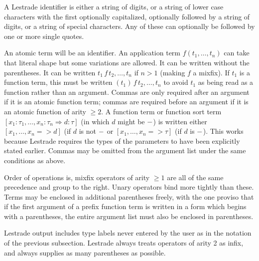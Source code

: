 \documentclass[12pt]{article}
\begin{document}
A Lestrade identifier is either a string of digits, or a string of lower case characters with the first optionally capitalized, optionally followed by a string of digits, or a string of special characters.  Any of these can optionally be followed by one or more single quotes.

An atomic term will be an identifier.  An application term $f(t_1,\ldots,t_n)$ can take that literal shape but some variations are allowed.  It can be written without the parentheses.  It can be written $t_1\, f \,t_2,\ldots,t_n$ if $n>1$ (making $f$ a mixfix).  If $t_1$ is a function term, this must be written
$(t_1) \,f \,t_2,\ldots,t_n$ to avoid $t_1$ as being read as a function rather than an argument.  Commas are only required
after an argument if it is an atomic function term;  commas are required before an argument if it is an atomic function of arity $\geq 2$.  A function term or function sort term $[x_1:\tau_1,\ldots,x_n:\tau_n \Rightarrow d:\tau]$ (in which $d$ might be ${\tt -}$) is written either $[x_1,\ldots,x_n=>d]$ (if $d$ is not ${\tt -}$ or $[x_1,\ldots,x_n=>\tau]$ (if $d$ is ${\tt -}$).  This works because Lestrade requires the types of the parameters to have been explicitly stated earlier.  Commas may be omitted from the argument list under the same conditions as above.

Order of operations is, mixfix operators of arity $\geq 1$ are all of the same precedence and group to the right.
Unary operators bind more tightly than these.  Terms may be enclosed in additional parentheses freely, with the one proviso that if the first argument of a prefix function term is written in a form which begins with a parentheses, the entire argument list must
also be enclosed in parentheses.
 
Lestrade output includes type labels never entered by the user as in the notation of the previous subsection.
Lestrade always treats operators of arity 2 as infix, and always supplies as many parentheses as possible.
\end{document}
